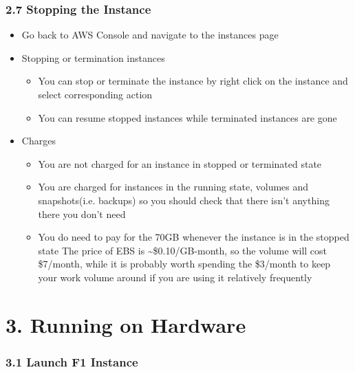 \documentclass[]{article}
\begin{document}
\hypertarget{header-n373}{%
\subsubsection{2.7 Stopping the Instance}\label{header-n373}}

\begin{itemize}
\item
  Go back to AWS Console and navigate to the instances page
\item
  Stopping or termination instances

  \begin{itemize}
  \item
    You can stop or terminate the instance by right click on the
    instance and select corresponding action
  \item
    You can resume stopped instances while terminated instances are gone
  \end{itemize}
\item
  Charges

  \begin{itemize}
  \item
    You are not charged for an instance in stopped or terminated state
  \item
    You are charged for instances in the running state, volumes and
    snapshots(i.e. backups) so you should check that there isn't
    anything there you don't need
  \item
    You do need to pay for the 70GB whenever the instance is in the
    stopped state The price of EBS is \textasciitilde{}\$0.10/GB-month,
    so the volume will cost \$7/month, while it is probably worth
    spending the \$3/month to keep your work volume around if you are
    using it relatively frequently
  \end{itemize}
\end{itemize}

\hypertarget{header-n404}{%
\section{3. Running on Hardware}\label{header-n404}}

\hypertarget{header-n419}{%
\subsubsection{3.1 Launch F1 Instance}\label{header-n419}}
\end{document}
